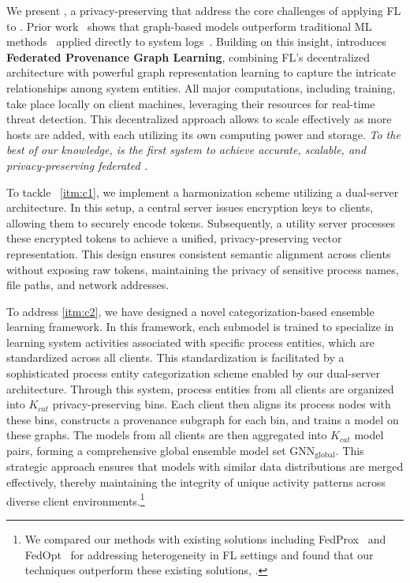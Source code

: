\smallskip
{}
\smallskip

\noindent
We present \Sys, a privacy-preserving \pids that address the core challenges of applying FL to \pids. Prior work~\cite{wang2022threatrace} shows that graph-based models outperform traditional ML methods~\cite{chowdhary2020natural, goodfellow2020generative} applied directly to system logs~\cite{deeplog2017, xia2019loggan}. Building on this insight, \Sys introduces {\bf Federated Provenance Graph Learning}, combining FL’s decentralized architecture with powerful graph representation learning to capture the intricate relationships among system entities. All major computations, including training, take place locally on client machines, leveraging their resources for real-time threat detection. This decentralized approach allows \Sys to scale effectively as more hosts are added, with each utilizing its own computing power and storage.  {\it To the best of our knowledge, \Sys is the first system to achieve accurate, scalable, and privacy-preserving federated \pids.}

 To tackle ~\ref{itm:c1}, we implement a \wordvec harmonization scheme utilizing a dual-server architecture. In this setup, a central server issues encryption keys to clients, allowing them to securely encode \wordvec tokens. Subsequently, a utility server processes these encrypted tokens to achieve a unified, privacy-preserving vector representation. This design ensures consistent semantic alignment across clients without exposing raw tokens, maintaining the privacy of sensitive process names, file paths, and network addresses.

 To address \ref{itm:c2}, we have designed a novel categorization-based \gnnshort ensemble learning framework. In this framework, each submodel is trained to specialize in learning system activities associated with specific process entities, which are standardized across all clients. This standardization is facilitated by a sophisticated process entity categorization scheme enabled by our dual-server architecture. Through this system, process entities from all clients are organized into  \( K_{cat} \) privacy-preserving bins. Each client then aligns its process nodes with these bins, constructs a provenance subgraph for each bin, and trains a \gnnshort model on these graphs. The models from all clients are then aggregated into  \( K_{cat} \) model pairs, forming a comprehensive global ensemble model set \( \text{GNN}_{\text{global}} \). This strategic approach ensures that models with similar data distributions are merged effectively, thereby maintaining the integrity of unique activity patterns across diverse client environments.\footnote{We compared our methods with existing solutions including FedProx~\cite{li2020federated} and FedOpt~\cite{asad2020fedopt} for addressing heterogeneity in FL settings and found that our techniques outperform these existing solutions, .}

